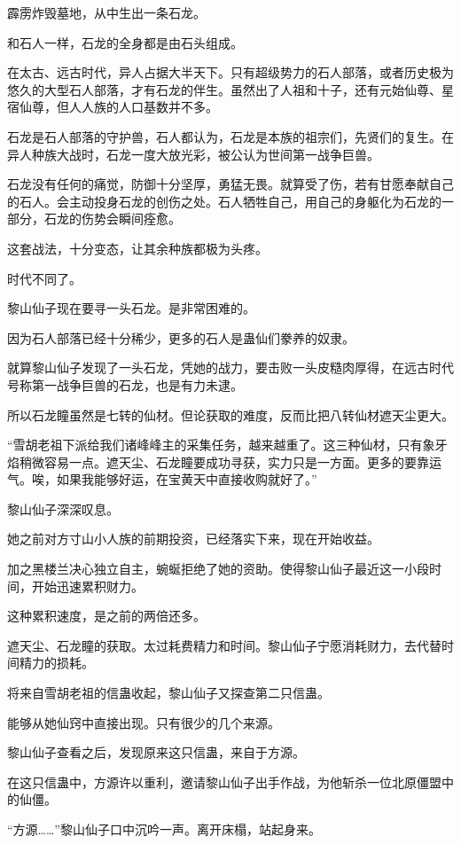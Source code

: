 \begin{this_body}
霹雳炸毁墓地，从中生出一条石龙。

和石人一样，石龙的全身都是由石头组成。

在太古、远古时代，异人占据大半天下。只有超级势力的石人部落，或者历史极为悠久的大型石人部落，才有石龙的伴生。虽然出了人祖和十子，还有元始仙尊、星宿仙尊，但人人族的人口基数并不多。

石龙是石人部落的守护兽，石人都认为，石龙是本族的祖宗们，先贤们的复生。在异人种族大战时，石龙一度大放光彩，被公认为世间第一战争巨兽。

石龙没有任何的痛觉，防御十分坚厚，勇猛无畏。就算受了伤，若有甘愿奉献自己的石人。会主动投身石龙的创伤之处。石人牺牲自己，用自己的身躯化为石龙的一部分，石龙的伤势会瞬间痊愈。

这套战法，十分变态，让其余种族都极为头疼。

时代不同了。

黎山仙子现在要寻一头石龙。是非常困难的。

因为石人部落已经十分稀少，更多的石人是蛊仙们豢养的奴隶。

就算黎山仙子发现了一头石龙，凭她的战力，要击败一头皮糙肉厚得，在远古时代号称第一战争巨兽的石龙，也是有力未逮。

所以石龙瞳虽然是七转的仙材。但论获取的难度，反而比把八转仙材遮天尘更大。

“雪胡老祖下派给我们诸峰峰主的采集任务，越来越重了。这三种仙材，只有象牙焰稍微容易一点。遮天尘、石龙瞳要成功寻获，实力只是一方面。更多的要靠运气。唉，如果我能够好运，在宝黄天中直接收购就好了。”

黎山仙子深深叹息。

她之前对方寸山小人族的前期投资，已经落实下来，现在开始收益。

加之黑楼兰决心独立自主，蜿蜒拒绝了她的资助。使得黎山仙子最近这一小段时间，开始迅速累积财力。

这种累积速度，是之前的两倍还多。

遮天尘、石龙瞳的获取。太过耗费精力和时间。黎山仙子宁愿消耗财力，去代替时间精力的损耗。

将来自雪胡老祖的信蛊收起，黎山仙子又探查第二只信蛊。

能够从她仙窍中直接出现。只有很少的几个来源。

黎山仙子查看之后，发现原来这只信蛊，来自于方源。

在这只信蛊中，方源许以重利，邀请黎山仙子出手作战，为他斩杀一位北原僵盟中的仙僵。

“方源……”黎山仙子口中沉吟一声。离开床榻，站起身来。


\end{this_body}
